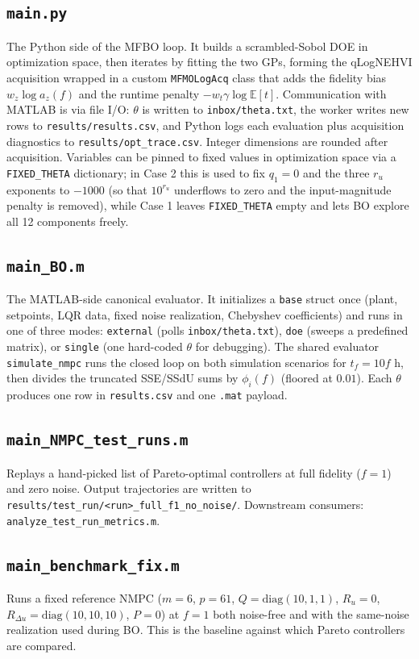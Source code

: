 \documentclass[11pt,a4paper]{article}
\begin{document}
\subsection{\texttt{main.py}}
The Python side of the MFBO loop. It builds a scrambled-Sobol DOE in optimization space, then iterates by fitting the two GPs, forming the qLogNEHVI acquisition wrapped in a custom \texttt{MFMOLogAcq} class that adds the fidelity bias $w_z \log a_z(f)$ and the runtime penalty $-w_t \gamma \log \mathbb{E}[t]$. Communication with MATLAB is via file I/O: $\theta$ is written to \texttt{inbox/theta.txt}, the worker writes new rows to \texttt{results/results.csv}, and Python logs each evaluation plus acquisition diagnostics to \texttt{results/opt\_trace.csv}. Integer dimensions are rounded after acquisition. Variables can be pinned to fixed values in optimization space via a \texttt{FIXED\_THETA} dictionary; in Case 2 this is used to fix $q_1 = 0$ and the three $r_u$ exponents to $-1000$ (so that $10^{r_u}$ underflows to zero and the input-magnitude penalty is removed), while Case 1 leaves \texttt{FIXED\_THETA} empty and lets BO explore all 12 components freely.

\subsection{\texttt{main\_BO.m}}
The MATLAB-side canonical evaluator. It initializes a \texttt{base} struct once (plant, setpoints, LQR data, fixed noise realization, Chebyshev coefficients) and runs in one of three modes: \texttt{external} (polls \texttt{inbox/theta.txt}), \texttt{doe} (sweeps a predefined matrix), or \texttt{single} (one hard-coded $\theta$ for debugging). The shared evaluator \texttt{simulate\_nmpc} runs the closed loop on both simulation scenarios for $t_f = 10f$ h, then divides the truncated SSE/SSdU sums by $\phi_i(f)$ (floored at $0.01$). Each $\theta$ produces one row in \texttt{results.csv} and one \texttt{.mat} payload.

\subsection{\texttt{main\_NMPC\_test\_runs.m}}
Replays a hand-picked list of Pareto-optimal controllers at full fidelity ($f=1$) and zero noise. Output trajectories are written to \texttt{results/test\_run/\textless run\textgreater \_full\_f1\_no\_noise/}. Downstream consumers: \texttt{analyze\_test\_run\_metrics.m}.

\subsection{\texttt{main\_benchmark\_fix.m}}
Runs a fixed reference NMPC ($m=6$, $p=61$, $Q = \mathrm{diag}(10, 1, 1)$, $R_u = 0$, $R_{\Delta u} = \mathrm{diag}(10, 10, 10)$, $P = 0$) at $f = 1$ both noise-free and with the same-noise realization used during BO. This is the baseline against which Pareto controllers are compared.
\end{document}
